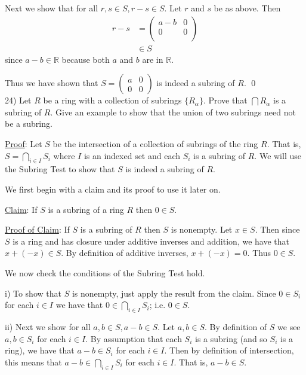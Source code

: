\documentclass{article}
\begin{document}
Next we show that for all $r, s \in S, r - s \in S$. Let $r$ and $s$ be as above. Then
\begin{align*}
	r - s &=
	\begin{pmatrix}
		a - b & 0 \\ 
		0 & 0 \\
	\end{pmatrix} \\
	& \in S
\end{align*} since $a - b \in \mathbb{R}$ because both $a$ and $b$ are in $\mathbb{R}$.

Thus we have shown that $S =
\begin{pmatrix}
a & 0 \\
0 & 0
\end{pmatrix}$ is indeed a subring of $R$. \qed \\

24) Let $R$ be a ring with a collection of subrings $\{R_{\alpha}\}$. Prove that $\bigcap R_{\alpha}$ is a subring of $R$. Give an example to show that the union of two subrings need not be a subring.

\underline{Proof}: Let $S$ be the intersection of a collection of subrings of the ring $R$. That is, $S = \underset{i \in I}{\bigcap} S_i$ where $I$ is an indexed set and each $S_i$ is a subring of $R$. We will use the Subring Test to show that $S$ is indeed a subring of $R$.

We first begin with a claim and its proof to use it later on.

\underline{Claim}: If $S$ is a subring of a ring $R$ then $0 \in S$.

\underline{Proof of Claim}: If $S$ is a subring of $R$ then $S$ is nonempty. Let $x \in S$. Then since $S$ is a ring and has closure under additive inverses and addition, we have that $x + (-x) \in S$. By definition of additive inverses, $x + (-x) = 0$. Thus $0 \in S$.

We now check the conditions of the Subring Test hold.

i) To show that $S$ is nonempty, just apply the result from the claim. Since $0 \in S_i$ for each $i \in I$ we have that $0 \in \underset{i \in I}{\bigcap} S_i$; i.e. $0 \in S$.

ii) Next we show for all $a, b \in S, a - b \in S$. Let $a, b \in S$. By definition of $S$ we see $a, b \in S_i$ for each $i \in I$. By assumption that each $S_i$ is a subring (and so $S_i$ is a ring), we have that $a - b \in S_i$ for each $i \in I$. Then by definition of intersection, this means that $a - b \in \underset{i \in I}{\bigcap} S_i$ for each $i \in I$. That is, $a - b \in S$.
\end{document}
